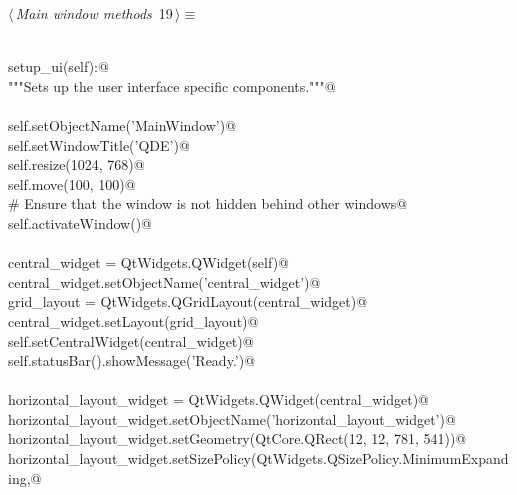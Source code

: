 \documentclass[
    a4paper,      %
    10pt,         %
    openright,    %
    notitlepage,  %
    parskip=half, %
]{scrreprt}       %
\theoremstyle{definition}                    %
\begin{document}

\begin{flushleft} \small
\begin{minipage}{\linewidth}\label{scrap11}\raggedright\small
{} $\langle\,${\itshape Main window methods}\nobreak\ {\footnotesize {19}}$\,\rangle\equiv$
\vspace{-1exm}
\begin{list}{}{} \item
\mbox{}\lstinline@@\\
\mbox{}\lstinline@def setup_ui(self):@\\
\mbox{}\lstinline@    """Sets up the user interface specific components."""@\\
\mbox{}\lstinline@@\\
\mbox{}\lstinline@    self.setObjectName('MainWindow')@\\
\mbox{}\lstinline@    self.setWindowTitle('QDE')@\\
\mbox{}\lstinline@    self.resize(1024, 768)@\\
\mbox{}\lstinline@    self.move(100, 100)@\\
\mbox{}\lstinline@    # Ensure that the window is not hidden behind other windows@\\
\mbox{}\lstinline@    self.activateWindow()@\\
\mbox{}\lstinline@@\\
\mbox{}\lstinline@    central_widget = QtWidgets.QWidget(self)@\\
\mbox{}\lstinline@    central_widget.setObjectName('central_widget')@\\
\mbox{}\lstinline@    grid_layout = QtWidgets.QGridLayout(central_widget)@\\
\mbox{}\lstinline@    central_widget.setLayout(grid_layout)@\\
\mbox{}\lstinline@    self.setCentralWidget(central_widget)@\\
\mbox{}\lstinline@    self.statusBar().showMessage('Ready.')@\\
\mbox{}\lstinline@@\\
\mbox{}\lstinline@    horizontal_layout_widget = QtWidgets.QWidget(central_widget)@\\
\mbox{}\lstinline@    horizontal_layout_widget.setObjectName('horizontal_layout_widget')@\\
\mbox{}\lstinline@    horizontal_layout_widget.setGeometry(QtCore.QRect(12, 12, 781, 541))@\\
\mbox{}\lstinline@    horizontal_layout_widget.setSizePolicy(QtWidgets.QSizePolicy.MinimumExpanding,@\\

\end{list}
\end{minipage}
\end{flushleft}
\end{document}
